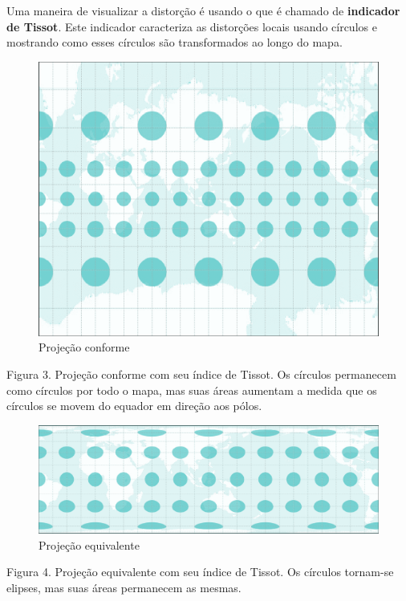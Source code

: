 \documentclass[
]{krantz}
\begin{document}
Uma maneira de visualizar a distorção é usando o que é chamado de \textbf{indicador de Tissot}. Este indicador caracteriza as distorções locais usando círculos e mostrando como esses círculos são transformados ao longo do mapa.

\begin{figure}
\centering
\includegraphics{media/modulo0/conformal.png}
\caption{Projeção conforme}
\end{figure}

Figura 3. Projeção conforme com seu índice de Tissot. Os círculos permanecem como círculos por todo o mapa, mas suas áreas aumentam a medida que os círculos se movem do equador em direção aos pólos.

\begin{figure}
\centering
\includegraphics{media/modulo0/authalic.png}
\caption{Projeção equivalente}
\end{figure}

Figura 4. Projeção equivalente com seu índice de Tissot. Os círculos tornam-se elipses, mas suas áreas permanecem as mesmas.
\end{document}
